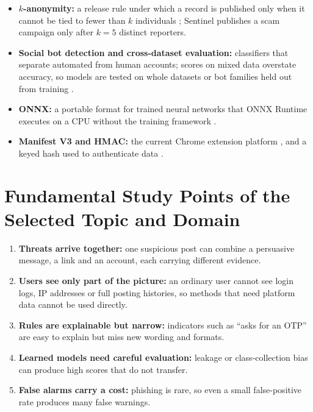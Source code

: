 \begin{itemize}
\item \textbf{$k$-anonymity:} a release rule under which a record is published only when it cannot be tied to fewer than $k$ individuals \cite{sweeney}; Sentinel publishes a scam campaign only after $k=5$ distinct reporters.
\item \textbf{Social bot detection and cross-dataset evaluation:} classifiers that separate automated from human accounts; scores on mixed data overstate accuracy, so models are tested on whole datasets or bot families held out from training \cite{yang2020,cresci2017}.
\item \textbf{ONNX:} a portable format for trained neural networks that ONNX Runtime executes on a CPU without the training framework \cite{onnx}.
\item \textbf{Manifest V3 and HMAC:} the current Chrome extension platform \cite{mv3}, and a keyed hash used to authenticate data \cite{hmac}.
\end{itemize}

\section{Fundamental Study Points of the Selected Topic and Domain}
\begin{enumerate}
\item \textbf{Threats arrive together:} one suspicious post can combine a persuasive message, a link and an account, each carrying different evidence.
\item \textbf{Users see only part of the picture:} an ordinary user cannot see login logs, IP addresses or full posting histories, so methods that need platform data \cite{lit2} cannot be used directly.
\item \textbf{Rules are explainable but narrow:} indicators such as ``asks for an OTP'' are easy to explain but miss new wording and formats.
\item \textbf{Learned models need careful evaluation:} leakage or class-collection bias can produce high scores that do not transfer.
\item \textbf{False alarms carry a cost:} phishing is rare, so even a small false-positive rate produces many false warnings.
\end{enumerate}

